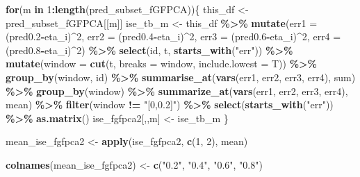 \documentclass[
]{article}
\newenvironment{Shaded}{\begin{snugshade}}{\end{snugshade}}
\newcommand{\AttributeTok}[1]{\textcolor[rgb]{0.13,0.29,0.53}{#1}}
\newcommand{\ControlFlowTok}[1]{\textcolor[rgb]{0.13,0.29,0.53}{\textbf{#1}}}
\newcommand{\DecValTok}[1]{\textcolor[rgb]{0.00,0.00,0.81}{#1}}
\newcommand{\FloatTok}[1]{\textcolor[rgb]{0.00,0.00,0.81}{#1}}
\newcommand{\FunctionTok}[1]{\textcolor[rgb]{0.13,0.29,0.53}{\textbf{#1}}}
\newcommand{\NormalTok}[1]{#1}
\newcommand{\OtherTok}[1]{\textcolor[rgb]{0.56,0.35,0.01}{#1}}
\newcommand{\SpecialCharTok}[1]{\textcolor[rgb]{0.81,0.36,0.00}{\textbf{#1}}}
\newcommand{\StringTok}[1]{\textcolor[rgb]{0.31,0.60,0.02}{#1}}
\begin{document}
\begin{Shaded}
\begin{Highlighting}[]
\ControlFlowTok{for}\NormalTok{(m }\ControlFlowTok{in} \DecValTok{1}\SpecialCharTok{:}\FunctionTok{length}\NormalTok{(pred\_subset\_fGFPCA))\{}
\NormalTok{  this\_df }\OtherTok{\textless{}{-}}\NormalTok{ pred\_subset\_fGFPCA[[m]]}
\NormalTok{  ise\_tb\_m }\OtherTok{\textless{}{-}}\NormalTok{ this\_df }\SpecialCharTok{\%\textgreater{}\%}
    \FunctionTok{mutate}\NormalTok{(}\AttributeTok{err1 =}\NormalTok{ (pred0}\FloatTok{.2}\SpecialCharTok{{-}}\NormalTok{eta\_i)}\SpecialCharTok{\^{}}\DecValTok{2}\NormalTok{,}
           \AttributeTok{err2 =}\NormalTok{ (pred0}\FloatTok{.4}\SpecialCharTok{{-}}\NormalTok{eta\_i)}\SpecialCharTok{\^{}}\DecValTok{2}\NormalTok{,}
           \AttributeTok{err3 =}\NormalTok{ (pred0}\FloatTok{.6}\SpecialCharTok{{-}}\NormalTok{eta\_i)}\SpecialCharTok{\^{}}\DecValTok{2}\NormalTok{,}
           \AttributeTok{err4 =}\NormalTok{ (pred0}\FloatTok{.8}\SpecialCharTok{{-}}\NormalTok{eta\_i)}\SpecialCharTok{\^{}}\DecValTok{2}\NormalTok{) }\SpecialCharTok{\%\textgreater{}\%}
    \FunctionTok{select}\NormalTok{(id, t, }\FunctionTok{starts\_with}\NormalTok{(}\StringTok{"err"}\NormalTok{)) }\SpecialCharTok{\%\textgreater{}\%} 
    \FunctionTok{mutate}\NormalTok{(}\AttributeTok{window =} \FunctionTok{cut}\NormalTok{(t, }\AttributeTok{breaks =}\NormalTok{ window, }\AttributeTok{include.lowest =}\NormalTok{ T)) }\SpecialCharTok{\%\textgreater{}\%} 
    \FunctionTok{group\_by}\NormalTok{(window, id) }\SpecialCharTok{\%\textgreater{}\%} 
    \FunctionTok{summarise\_at}\NormalTok{(}\FunctionTok{vars}\NormalTok{(err1, err2, err3, err4), sum) }\SpecialCharTok{\%\textgreater{}\%} 
    \FunctionTok{group\_by}\NormalTok{(window) }\SpecialCharTok{\%\textgreater{}\%} 
    \FunctionTok{summarize\_at}\NormalTok{(}\FunctionTok{vars}\NormalTok{(err1, err2, err3, err4), mean) }\SpecialCharTok{\%\textgreater{}\%}
    \FunctionTok{filter}\NormalTok{(window }\SpecialCharTok{!=} \StringTok{"[0,0.2]"}\NormalTok{) }\SpecialCharTok{\%\textgreater{}\%} 
    \FunctionTok{select}\NormalTok{(}\FunctionTok{starts\_with}\NormalTok{(}\StringTok{"err"}\NormalTok{)) }\SpecialCharTok{\%\textgreater{}\%} \FunctionTok{as.matrix}\NormalTok{()}
\NormalTok{  ise\_fgfpca2[,,m] }\OtherTok{\textless{}{-}}\NormalTok{ ise\_tb\_m}
\NormalTok{\}}

\NormalTok{mean\_ise\_fgfpca2 }\OtherTok{\textless{}{-}} \FunctionTok{apply}\NormalTok{(ise\_fgfpca2, }\FunctionTok{c}\NormalTok{(}\DecValTok{1}\NormalTok{, }\DecValTok{2}\NormalTok{), mean)}

\FunctionTok{colnames}\NormalTok{(mean\_ise\_fgfpca2) }\OtherTok{\textless{}{-}} \FunctionTok{c}\NormalTok{(}\StringTok{"0.2"}\NormalTok{, }\StringTok{"0.4"}\NormalTok{, }\StringTok{"0.6"}\NormalTok{, }\StringTok{"0.8"}\NormalTok{)}
\end{Highlighting}
\end{Shaded}
\end{document}
